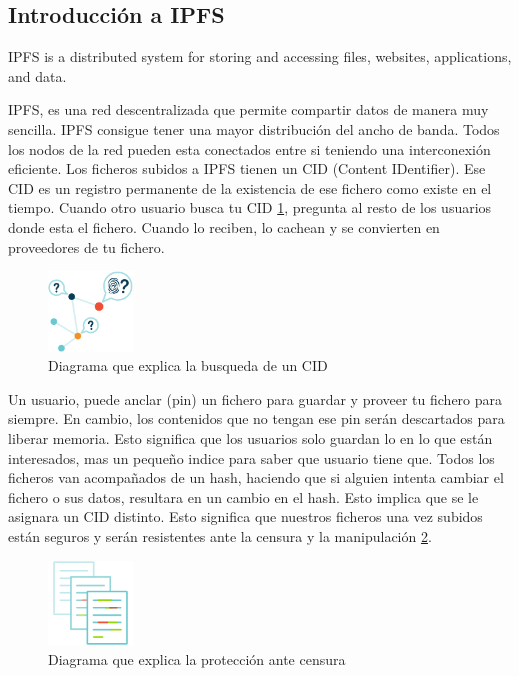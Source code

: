 \subsection*{Introducción a IPFS}
\begin{displayquote}
    IPFS is a distributed system for storing and accessing files, websites, applications, and data.
\end{displayquote}
IPFS, es una red descentralizada que permite compartir datos de manera muy sencilla. IPFS consigue tener una mayor distribución del ancho de banda.
Todos los nodos de la red pueden esta conectados entre si teniendo una interconexión eficiente. Los ficheros subidos a IPFS tienen un CID (Content IDentifier). Ese CID es un registro permanente de la existencia de ese fichero como existe en el tiempo.
Cuando otro usuario busca tu CID \ref{fg:looking_for_CID}, pregunta al resto de los usuarios donde esta el fichero. Cuando lo reciben, lo cachean y se convierten en proveedores de tu fichero.
\begin{figure}[h!]
    \centering
    \includegraphics[width=0.2\textwidth]{Figures/svgviewer-png-output.png}
    \caption{Diagrama que explica la busqueda de un CID}
    \label{fg:looking_for_CID}
\end{figure}
Un usuario, puede anclar (pin) un fichero para guardar y proveer tu fichero para siempre. En cambio, los contenidos que no tengan ese pin serán descartados para liberar memoria. Esto significa que los usuarios solo guardan lo en lo que están interesados, mas un pequeño indice para saber que usuario tiene que.
Todos los ficheros van acompañados de un hash, haciendo que si alguien intenta cambiar el fichero o sus datos, resultara en un cambio en el hash. Esto implica que se le asignara un CID distinto. Esto significa que nuestros ficheros una vez subidos están seguros y serán resistentes ante la censura y la manipulación \ref{fg:keeping_IPFS_safe}.
\begin{figure}[h!]
    \centering
    \includegraphics[width=0.2\textwidth]{Figures/svgviewer-png-output(2).png}
    \caption{Diagrama que explica la protección ante censura}
    \label{fg:keeping_IPFS_safe}
\end{figure}
\newpage
\thispagestyle{empty}